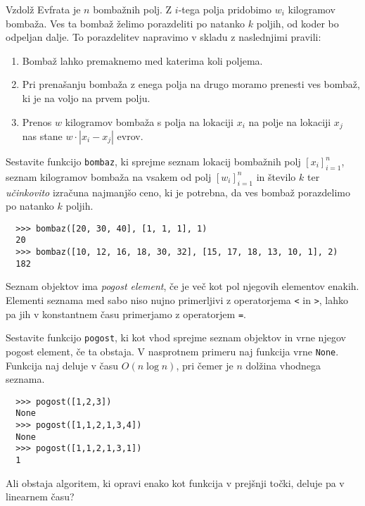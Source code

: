 \documentclass[arhiv]{../izpit}
\begin{document}
  Vzdolž Evfrata je $n$ bombažnih polj. Z $i$-tega polja pridobimo $w_i$
  kilogramov bombaža. Ves ta bombaž želimo porazdeliti po natanko $k$
  poljih, od koder bo odpeljan dalje. To porazdelitev napravimo v
  skladu z naslednjimi pravili:

  \begin{enumerate}
    \item Bombaž lahko premaknemo med katerima koli poljema.
    \item Pri prenašanju bombaža z enega polja na drugo moramo prenesti
    ves bombaž, ki je na voljo na prvem polju.
    \item Prenos $w$ kilogramov bombaža s polja na lokaciji $x_i$ na polje
    na lokaciji $x_j$ nas stane $w \cdot |x_i - x_j|$ evrov.
  \end{enumerate}

 Sestavite funkcijo \texttt{bombaz}, ki sprejme seznam
 lokacij bombažnih polj $[x_i]_{i=1}^n$, seznam kilogramov bombaža na vsakem od polj 
 $[w_i]_{i=1}^n$ in
 število $k$ ter {\em učinkovito} izračuna najmanjšo ceno, ki je potrebna,
 da ves bombaž porazdelimo po natanko $k$ poljih.

  \begin{verbatim}
  >>> bombaz([20, 30, 40], [1, 1, 1], 1)
  20
  >>> bombaz([10, 12, 16, 18, 30, 32], [15, 17, 18, 13, 10, 1], 2)
  182
  \end{verbatim}



  Seznam objektov ima {\em pogost element}, če je več kot pol njegovih elementov
  enakih. Elementi seznama med sabo niso nujno primerljivi z operatorjema \texttt{<}
  in \texttt{>}, lahko pa jih v konstantnem času primerjamo z operatorjem
  \texttt{=}. 

  \podnaloga Sestavite funkcijo \texttt{pogost}, ki kot vhod sprejme seznam
  objektov in vrne njegov pogost element, če ta obstaja. V nasprotnem primeru naj
  funkcija vrne \texttt{None}. Funkcija naj deluje v času $O(n \log n)$, pri 
  čemer je $n$ dolžina vhodnega seznama.

  \begin{verbatim}
  >>> pogost([1,2,3])
  None
  >>> pogost([1,1,2,1,3,4])
  None
  >>> pogost([1,1,2,1,3,1])
  1
  \end{verbatim}

  \podnaloga Ali obstaja algoritem, ki opravi enako kot funkcija v prejšnji
  točki, deluje pa v linearnem času?
\end{document}
